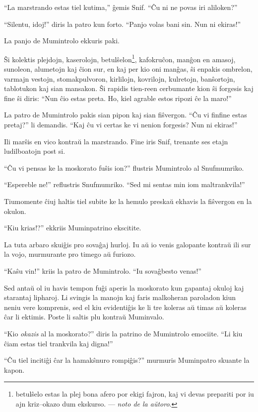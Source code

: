 ``La marstrando estas tiel kutima,'' ĝemis Snif. ``Ĉu ni ne povas iri aliloken?''

``Silentu, idoj!'' diris la patro kun forto. ``Panjo volas bani sin. Nun ni ekiras!''

La panjo de Mumintrolo ekkuris paki.

Ŝi kolektis plejdojn, kaserolojn, betulŝelon\footnote{betulŝelo estas la plej bona afero por ekigi fajron, kaj vi devas prepariti por iu ajn kriz--okazo dum ekskurso. --- \emph{noto de la aŭtoro}.}, kafokruĉon, manĝon en amasoj, sunoleon, alumetojn kaj ĉion sur, en kaj per kio oni manĝas, ŝi enpakis ombrelon, varmajn vestojn, stomakpulvoron, kirlilojn, kovrilojn, kulretojn, banŝortojn, tablotukon kaj sian mansakon. Ŝi rapidis tien-reen cerbumante kion ŝi forgesis kaj fine ŝi diris: ``Nun ĉio estas preta. Ho, kiel agrable estos ripozi ĉe la maro!''

La patro de Mumintrolo pakis sian pipon kaj sian fiŝvergon. ``Ĉu vi finfine estas pretaj?'' li demandis. ``Kaj ĉu vi certas ke vi nenion forgesis? Nun ni ekiras!''

Ili marŝis en vico kontraŭ la marstrando. Fine iris Snif, trenante ses etajn ludilboatojn post si.

``Ĉu vi pensas ke la moskorato fuŝis ion?'' flustris Mumintrolo al Snufmumriko.

``Espereble ne!'' reflustris Snufmumriko. ``Sed mi sentas min iom maltrankvila!''

Tiumomente ĉiuj haltis tiel subite ke la hemulo preskaŭ ekhavis la fiŝvergon en la okulon.

``Kiu krias!?'' ekkriis Muminpatrino ekscitite.

La tuta arbaro skuiĝis pro sovaĝaj hurloj. Iu aŭ io venis galopante kontraŭ ili sur la vojo, murmurante pro timego aŭ furiozo.

``Kaŝu vin!'' kriis la patro de Mumintrolo. ``Iu sovaĝbesto venas!''

Sed antaŭ ol iu havis tempon fuĝi aperis la moskorato kun gapantaj okuloj kaj starantaj lipharoj. Li svingis la manojn kaj faris malkoheran paroladon kiun neniu vere komprenis, sed el kiu evidentiĝis ke li tre koleras aŭ timas aŭ koleras ĉar li ektimis. Poste li saltis plu kontraŭ Muminvalo.

``Kio \emph{okazis} al la moskorato?'' diris la patrino de Mumintrolo emociite. ``Li kiu ĉiam estas tiel trankvila kaj digna!''

``Ĉu tiel incitiĝi ĉar la hamakŝnuro rompiĝis?'' murmuris Muminpatro skuante la kapon.

